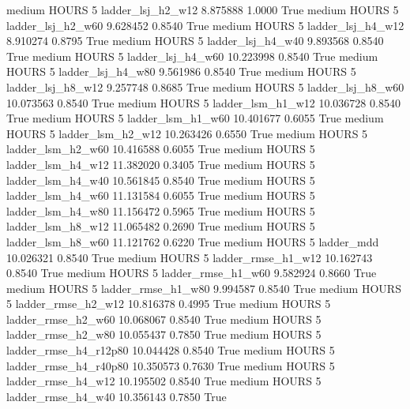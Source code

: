     medium    HOURS                 5      ladder_lsj_h2_w12   8.875888      1.0000    True
    medium    HOURS                 5      ladder_lsj_h2_w60   9.628452      0.8540    True
    medium    HOURS                 5      ladder_lsj_h4_w12   8.910274      0.8795    True
    medium    HOURS                 5      ladder_lsj_h4_w40   9.893568      0.8540    True
    medium    HOURS                 5      ladder_lsj_h4_w60  10.223998      0.8540    True
    medium    HOURS                 5      ladder_lsj_h4_w80   9.561986      0.8540    True
    medium    HOURS                 5      ladder_lsj_h8_w12   9.257748      0.8685    True
    medium    HOURS                 5      ladder_lsj_h8_w60  10.073563      0.8540    True
    medium    HOURS                 5      ladder_lsm_h1_w12  10.036728      0.8540    True
    medium    HOURS                 5      ladder_lsm_h1_w60  10.401677      0.6055    True
    medium    HOURS                 5      ladder_lsm_h2_w12  10.263426      0.6550    True
    medium    HOURS                 5      ladder_lsm_h2_w60  10.416588      0.6055    True
    medium    HOURS                 5      ladder_lsm_h4_w12  11.382020      0.3405    True
    medium    HOURS                 5      ladder_lsm_h4_w40  10.561845      0.8540    True
    medium    HOURS                 5      ladder_lsm_h4_w60  11.131584      0.6055    True
    medium    HOURS                 5      ladder_lsm_h4_w80  11.156472      0.5965    True
    medium    HOURS                 5      ladder_lsm_h8_w12  11.065482      0.2690    True
    medium    HOURS                 5      ladder_lsm_h8_w60  11.121762      0.6220    True
    medium    HOURS                 5             ladder_mdd  10.026321      0.8540    True
    medium    HOURS                 5     ladder_rmse_h1_w12  10.162743      0.8540    True
    medium    HOURS                 5     ladder_rmse_h1_w60   9.582924      0.8660    True
    medium    HOURS                 5     ladder_rmse_h1_w80   9.994587      0.8540    True
    medium    HOURS                 5     ladder_rmse_h2_w12  10.816378      0.4995    True
    medium    HOURS                 5     ladder_rmse_h2_w60  10.068067      0.8540    True
    medium    HOURS                 5     ladder_rmse_h2_w80  10.055437      0.7850    True
    medium    HOURS                 5  ladder_rmse_h4_r12p80  10.044428      0.8540    True
    medium    HOURS                 5  ladder_rmse_h4_r40p80  10.350573      0.7630    True
    medium    HOURS                 5     ladder_rmse_h4_w12  10.195502      0.8540    True
    medium    HOURS                 5     ladder_rmse_h4_w40  10.356143      0.7850    True
